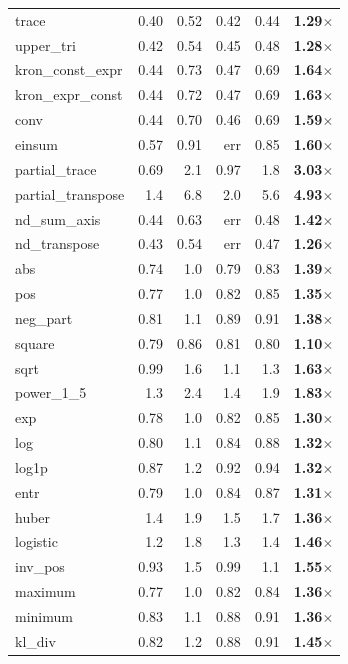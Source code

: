 \documentclass[11pt]{article}
\begin{document}
\begin{center}
\begin{longtable}{lrrrrr}
trace & 0.40 & 0.52 & 0.42 & 0.44 & \textbf{1.29$\times$} \\
upper\_tri & 0.42 & 0.54 & 0.45 & 0.48 & \textbf{1.28$\times$} \\
kron\_const\_expr & 0.44 & 0.73 & 0.47 & 0.69 & \textbf{1.64$\times$} \\
kron\_expr\_const & 0.44 & 0.72 & 0.47 & 0.69 & \textbf{1.63$\times$} \\
conv & 0.44 & 0.70 & 0.46 & 0.69 & \textbf{1.59$\times$} \\
einsum & 0.57 & 0.91 & err & 0.85 & \textbf{1.60$\times$} \\
partial\_trace & 0.69 & 2.1 & 0.97 & 1.8 & \textbf{3.03$\times$} \\
partial\_transpose & 1.4 & 6.8 & 2.0 & 5.6 & \textbf{4.93$\times$} \\
nd\_sum\_axis & 0.44 & 0.63 & err & 0.48 & \textbf{1.42$\times$} \\
nd\_transpose & 0.43 & 0.54 & err & 0.47 & \textbf{1.26$\times$} \\
abs & 0.74 & 1.0 & 0.79 & 0.83 & \textbf{1.39$\times$} \\
pos & 0.77 & 1.0 & 0.82 & 0.85 & \textbf{1.35$\times$} \\
neg\_part & 0.81 & 1.1 & 0.89 & 0.91 & \textbf{1.38$\times$} \\
square & 0.79 & 0.86 & 0.81 & 0.80 & \textbf{1.10$\times$} \\
sqrt & 0.99 & 1.6 & 1.1 & 1.3 & \textbf{1.63$\times$} \\
power\_1\_5 & 1.3 & 2.4 & 1.4 & 1.9 & \textbf{1.83$\times$} \\
exp & 0.78 & 1.0 & 0.82 & 0.85 & \textbf{1.30$\times$} \\
log & 0.80 & 1.1 & 0.84 & 0.88 & \textbf{1.32$\times$} \\
log1p & 0.87 & 1.2 & 0.92 & 0.94 & \textbf{1.32$\times$} \\
entr & 0.79 & 1.0 & 0.84 & 0.87 & \textbf{1.31$\times$} \\
huber & 1.4 & 1.9 & 1.5 & 1.7 & \textbf{1.36$\times$} \\
logistic & 1.2 & 1.8 & 1.3 & 1.4 & \textbf{1.46$\times$} \\
inv\_pos & 0.93 & 1.5 & 0.99 & 1.1 & \textbf{1.55$\times$} \\
maximum & 0.77 & 1.0 & 0.82 & 0.84 & \textbf{1.36$\times$} \\
minimum & 0.83 & 1.1 & 0.88 & 0.91 & \textbf{1.36$\times$} \\
kl\_div & 0.82 & 1.2 & 0.88 & 0.91 & \textbf{1.45$\times$} \\

\end{longtable}
\end{center}
\end{document}
